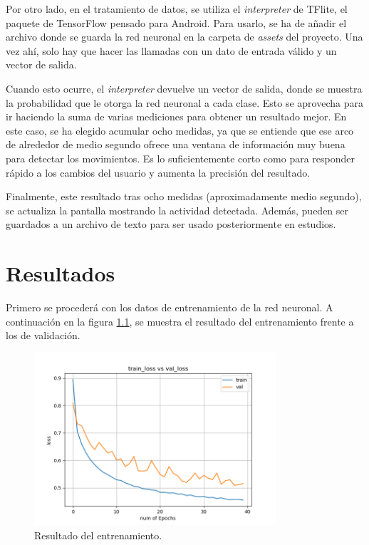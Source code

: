 \documentclass[12pt]{book}
\numberwithin{equation}{section}
\begin{document}
Por otro lado, en el tratamiento de datos, se utiliza el \textit{interpreter} de TFlite, el paquete de TensorFlow pensado para Android. Para usarlo, se ha de añadir el archivo donde se guarda la red neuronal en la carpeta de \textit{assets} del proyecto. Una vez ahí, solo hay que hacer las llamadas con un dato de entrada válido y un vector de salida.

Cuando esto ocurre, el \textit{interpreter} devuelve un vector de salida, donde se muestra la probabilidad que le otorga la red neuronal a cada clase. Esto se aprovecha para ir haciendo la suma de varias mediciones para obtener un resultado mejor. En este caso, se ha elegido acumular ocho medidas, ya que se entiende que ese arco de alrededor de medio segundo ofrece una ventana de información muy buena para detectar los movimientos. Es lo suficientemente corto como para responder rápido a los cambios del usuario y aumenta la precisión del resultado.

Finalmente, este resultado tras ocho medidas (aproximadamente medio segundo), se actualiza la pantalla mostrando la actividad detectada. Además, pueden ser guardados a un archivo de texto para ser usado posteriormente en estudios.

\newpage
\chapter{Resultados}

Primero se procederá con los datos de entrenamiento de la red neuronal. A continuación en la figura \ref{fig:possibleBF}, se muestra el resultado del entrenamiento frente a los de validación. 

\begin{figure}[h]
    \centering
    \includegraphics[width=0.8\textwidth]{PossibleBF_1.png}
    \caption{Resultado del entrenamiento.}
    \label{fig:possibleBF}
\end{figure}
\end{document}
